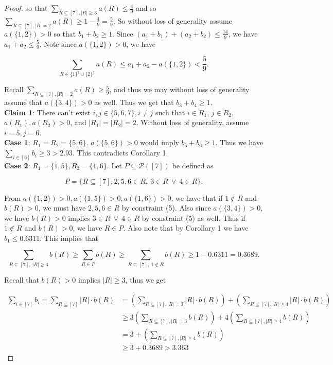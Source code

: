 \documentclass{article}
\begin{document}
\begin{proof}
\noindent
so that $\sum_{R \subseteq [7], |R| \geq 3} a(R) \leq \frac{4}{9}$ and so $\sum_{R \subseteq [7], |R| = 2} a(R) \geq 1- \frac{4}{9} = \frac{5}{9}$. So without loss of generality assume $a(\{1,2\}) > 0$ so that $b_1 + b_2 \geq 1$. Since $(a_1 + b_1) + (a_2+b_2) \leq \frac{14}{9}$, we have $a_1 + a_2 \leq \frac{5}{9}$. Note since $a(\{1,2\}) > 0$, we have 

$$\sum_{R \in \{1\}^{\uparrow} \cup \{2\}^{\uparrow}} a(R) \leq a_1 + a_2 - a(\{1,2\}) < \frac{5}{9}.$$

\noindent
Recall $\sum_{R \subseteq [7], |R| = 2} a(R) \geq \frac{5}{9}$, and thus we may without loss of generality assume that $a(\{3,4\}) > 0$ as well. Thus we get that $b_3 + b_4 \geq 1$. \\

\textbf{Claim 1}: There can't exist $i,j \in \{5,6,7\}, i \neq j$ such that $i \in R_1$, $j \in R_2$, $a(R_1),a(R_2) > 0$, and $|R_1| = |R_2| = 2$. Without loss of generality, assume $i = 5, j = 6$. \\

\textbf{Case 1}: $R_1 = R_2 = \{5,6\}$. $a(\{5,6\}) > 0$ would imply $b_5 + b_6 \geq 1$. Thus we have $\sum_{i \in [6]} b_i \geq 3 > 2.93$. This contradicts Corollary 1. \\

\textbf{Case 2}: $R_1 = \{1,5\}, R_2 = \{1,6\}$. Let $P \subseteq \mathcal{P}([7])$ be defined as 

$$P = \{R \subseteq [7] : 2,5,6 \in R, \ 3 \in R \ \vee \ 4 \in R \}.$$

From $a(\{1,2\}) > 0, a(\{1,5\}) > 0, a(\{1,6\}) > 0$, we have that if $1 \not \in R$ and $b(R) > 0$, we must have $2,5,6 \in R$ by constraint (5). Also since $a(\{3,4\}) > 0$, we have $b(R) > 0$ implies $3 \in R \ \vee \ 4  \in R$ by constraint (5) as well. Thus if $1 \not \in R$ and $b(R) > 0$, we have $R \in P$. Also note that by Corollary 1 we have $b_1 \leq 0.6311$. This implies that 

$$\sum_{R \subseteq [7], \ |R| \geq 4} b(R) \geq \sum_{R \in P} b(R) \geq \sum_{R \subseteq [7], \ 1 \not\in R} b(R) \geq 1 - 0.6311 = 0.3689.$$

\noindent
Recall that $b(R) > 0$ implies $|R| \geq 3$, thus we get 

\begin{align*}
\sum_{i \in [7]} b_i = \sum_{R \subseteq [7]} |R| \cdot b(R) &= \left( \sum_{R \subseteq [7], |R| = 3} |R| \cdot b(R) \right) + \left( \sum_{R \subseteq [7], |R| \geq 4} |R| \cdot b(R) \right) \\
&\geq 3 \left( \sum_{R \subseteq [7], |R| = 3} b(R) \right) + 4\left( \sum_{R \subseteq [7], |R| \geq 4} b(R) \right) \\
&= 3+\left( \sum_{R \subseteq [7], |R| \geq 4} b(R) \right) \\
&\geq 3 + 0.3689  > 3.363 
\end{align*}


\end{proof}
\end{document}
